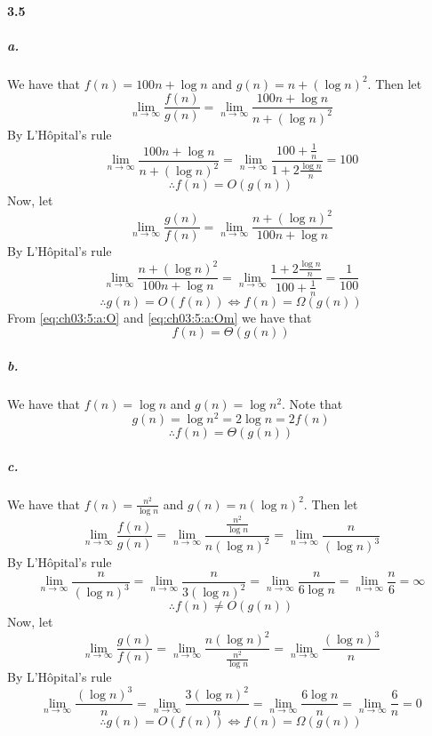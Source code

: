 
\paragraph{3.5}

\subparagraph{a.}

We have that $f(n) = 100n + \log n$ and $g(n) = n + (\log n)^2$.
Then let
\[
  \lim_{n \to \infty} \frac{f(n)}{g(n)} =
  \lim_{n \to \infty} \frac{100n + \log n}{n + (\log n)^2}
\]
By L'Hôpital's rule
\[
  \lim_{n \to \infty} \frac{100n + \log n}{n + (\log n)^2} =
  \lim_{n \to \infty} \frac{100 + \frac{1}{n}}{1 + 2\frac{\log n}{n}} = 100
\]
\begin{equation}\label{eq:ch03:5:a:O}
  \therefore f(n) = O(g(n))
\end{equation}
Now, let
\[
  \lim_{n \to \infty} \frac{g(n)}{f(n)} =
  \lim_{n \to \infty} \frac{n + (\log n)^2}{100n + \log n}
\]
By L'Hôpital's rule
\[
  \lim_{n \to \infty} \frac{n + (\log n)^2}{100n + \log n} =
  \lim_{n \to \infty} \frac{1 + 2\frac{\log n}{n}}{100 + \frac{1}{n}} =
  \frac{1}{100}
\]
\begin{equation}\label{eq:ch03:5:a:Om}
  \therefore g(n) = O(f(n)) \Leftrightarrow f(n) = \Omega(g(n))
\end{equation}
From \eqref{eq:ch03:5:a:O} and \eqref{eq:ch03:5:a:Om} we have that
\[
  f(n) = \Theta(g(n))
\]

\subparagraph{b.}

We have that $f(n) = \log n$ and $g(n) = \log n^2$.
Note that
\[
  g(n) = \log n^2 = 2\log n = 2 f(n)
\]
\[
  \therefore f(n) = \Theta(g(n))
\]

\subparagraph{c.}

We have that $f(n) = \frac{n^2}{\log n}$ and $g(n) = n(\log n)^2$.
Then let
\[
  \lim_{n \to \infty} \frac{f(n)}{g(n)} =
  \lim_{n \to \infty} \frac{\frac{n^2}{\log n}}{n(\log n)^2} =
  \lim_{n \to \infty} \frac{n}{(\log n)^3}
\]
By L'Hôpital's rule
\[
  \lim_{n \to \infty} \frac{n}{(\log n)^3} =
  \lim_{n \to \infty} \frac{n}{3(\log n)^2} =
  \lim_{n \to \infty} \frac{n}{6\log n} =
  \lim_{n \to \infty} \frac{n}{6} = \infty
\]
\[
  \therefore f(n) \neq O(g(n))
\]
Now, let
\[
  \lim_{n \to \infty} \frac{g(n)}{f(n)} =
  \lim_{n \to \infty} \frac{n(\log n)^2}{\frac{n^2}{\log n}} =
  \lim_{n \to \infty} \frac{(\log n)^3}{n}
\]
By L'Hôpital's rule
\[
  \lim_{n \to \infty} \frac{(\log n)^3}{n} =
  \lim_{n \to \infty} \frac{3(\log n)^2}{n} =
  \lim_{n \to \infty} \frac{6\log n}{n} =
  \lim_{n \to \infty} \frac{6}{n} = 0
\]
\[
  \therefore g(n) = O(f(n)) \Leftrightarrow f(n) = \Omega(g(n))
\]
